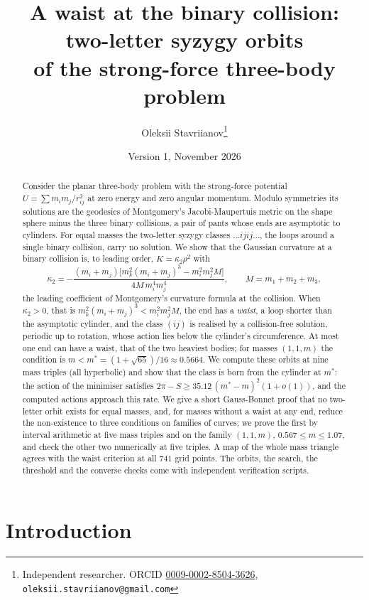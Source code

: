 \documentclass[11pt]{article}
\title{A waist at the binary collision: two-letter syzygy orbits\\ of the strong-force three-body problem}
\author{Oleksii Stavriianov\thanks{Independent researcher. ORCID \href{https://orcid.org/0009-0002-8504-3626}{0009-0002-8504-3626}, \texttt{oleksii.stavriianov@gmail.com}}}
\date{Version 1, November 2026}
\theoremstyle{definition}
\begin{document}
\maketitle

\begin{abstract}
Consider the planar three-body problem with the strong-force potential $U=\sum m_im_j/r_{ij}^2$ at zero energy and
zero angular momentum. Modulo symmetries its solutions are the geodesics of Montgomery's Jacobi-Maupertuis metric on
the shape sphere minus the three binary collisions, a pair of pants whose ends are asymptotic to cylinders. For equal
masses the two-letter syzygy classes $\dots ijij\dots$, the loops around a single binary collision, carry no
solution. We show that the Gaussian curvature at a binary collision is, to leading order, $K=\kappa_2\rho^2$ with
\[
  \kappa_2=-\frac{(m_i+m_j)\bigl[m_k^2(m_i+m_j)^3-m_i^2m_j^2M\bigr]}{4M\,m_i^4m_j^4},\qquad M=m_1+m_2+m_3,
\]
the leading coefficient of Montgomery's curvature formula at the collision. When $\kappa_2>0$, that is
$m_k^2(m_i+m_j)^3<m_i^2m_j^2M$, the end has a \emph{waist}, a loop shorter than the asymptotic cylinder, and the class
$(ij)$ is realised by a collision-free solution, periodic up to rotation, whose action lies below the cylinder's
circumference. At most one end can have a waist, that of the two heaviest bodies; for masses $(1,1,m)$ the condition
is $m<m^*=(1+\sqrt{65})/16\approx0.5664$. We compute these orbits at nine mass triples (all hyperbolic) and show that
the class is born from the cylinder at $m^*$: the action of the minimiser satisfies
$2\pi-S\ge35.12\,(m^*-m)^2(1+o(1))$, and the computed actions approach this rate. We give a short
Gauss-Bonnet proof that no two-letter orbit exists for equal masses, and, for masses without a waist at any end, reduce
the non-existence to three conditions on families of curves; we prove the first by interval arithmetic at five mass
triples and on the family $(1,1,m)$, $0.567\le m\le1.07$, and check the other two numerically at five triples. A map
of the whole mass triangle agrees with the waist criterion at all $741$ grid points. The orbits, the search, the threshold and the converse checks come with independent verification scripts.
\end{abstract}

\section{Introduction}
\end{document}
